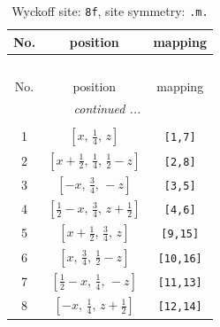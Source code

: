\documentclass[fleqn,8pt]{jsarticle}
\begin{document}
\begin{longtable}{ccc}
\caption{Wyckoff site: {\tt 8f}, site symmetry: {\tt .m.}}
 \\
 \hline \hline
No. & position & mapping \\ \hline \endfirsthead

\multicolumn{2}{l}{\tablename\ \thetable{}} \\
 \hline \hline
No. & position & mapping \\ \hline \endhead

 \hline \hline
\multicolumn{2}{r}{\footnotesize\it continued ...} \\ \endfoot

 \hline \hline
\multicolumn{2}{r}{} \\ \endlastfoot

1 & $\left[ x,\, \frac{1}{4},\, z \right]$ & {\tt [1,7]} \\ \hline
2 & $\left[ x + \frac{1}{2},\, \frac{1}{4},\, \frac{1}{2} - z \right]$ & {\tt [2,8]} \\ \hline
3 & $\left[ - x,\, \frac{3}{4},\, - z \right]$ & {\tt [3,5]} \\ \hline
4 & $\left[ \frac{1}{2} - x,\, \frac{3}{4},\, z + \frac{1}{2} \right]$ & {\tt [4,6]} \\ \hline
5 & $\left[ x + \frac{1}{2},\, \frac{3}{4},\, z \right]$ & {\tt [9,15]} \\ \hline
6 & $\left[ x,\, \frac{3}{4},\, \frac{1}{2} - z \right]$ & {\tt [10,16]} \\ \hline
7 & $\left[ \frac{1}{2} - x,\, \frac{1}{4},\, - z \right]$ & {\tt [11,13]} \\ \hline
8 & $\left[ - x,\, \frac{1}{4},\, z + \frac{1}{2} \right]$ & {\tt [12,14]} \\
\end{longtable}
\renewcommand{\arraystretch}{1.2}
\end{document}
